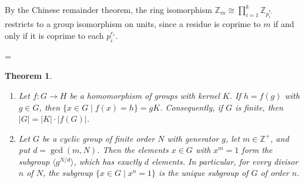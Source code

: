 \documentclass[11pt]{article}
\makeatletter
\theoremstyle{ntstyle}
\newtheorem{theorem}{Theorem}[subsection]
\newcommand{\statementitems}{\mbox{}}
\let\nt@closedisplay\]
\def\nt@guardedclose{\@ifnextchar\par{\nt@closeafterpar}{\@ifnextchar\end{\postdisplaypenalty\@M\nt@closedisplay}{\nt@closedisplay}}}
\def\nt@closeafterpar\par{\@ifnextchar\par{\nt@closeafterpar}{\@ifnextchar\end{\postdisplaypenalty\@M\nt@closedisplay\par}{\nt@closedisplay\par}}}
\renewenvironment{proof}[1][\proofname]{\par
  \pushQED{\qed}\normalfont\topsep\medskipamount\edef\nt@afterproof{\@endparpenalty=\the\@endparpenalty\relax}\@beginparpenalty\@M\@endparpenalty\@M\let\]\nt@guardedclose\trivlist\item[]\textit{#1\@addpunct{.}} \ignorespaces}{\ifvmode\addpenalty\@M\fi\popQED\nt@afterproof\endtrivlist\@endpefalse}
\makeatother
\begin{document}
\begin{proof} By the Chinese remainder theorem, the ring
	isomorphism $\mathbb{Z}_m \cong \prod_{i=1}^{k}\mathbb{Z}_{p_i^{e_i}}$
	restricts to a group isomorphism on units, since a residue is coprime
	to $m$ if and only if it is coprime to each $p_i^{e_i}$.

\end{proof}
\begin{theorem}\label{thm:6.6.5}\statementitems

	\begin{enumerate}[label={\alph*)}]
		\item Let $f:G\to H$ be a homomorphism of groups with kernel $K$. If
		      $h=f(g)$ with $g\in G$, then $\{x\in G\mid f(x)=h\}=gK$.
		      Consequently, if $G$ is finite, then $|G|=|K|\cdot|f(G)|$.
		\item Let $G$ be a cyclic group of finite order $N$ with generator $g$,
		      let $m\in\mathbb{Z}^+$, and put $d=\gcd(m,N)$. Then the elements
		      $x\in G$ with $x^m=1$ form the subgroup $\langle g^{N/d}\rangle$,
		      which has exactly $d$ elements. In particular, for every divisor $n$
		      of $N$, the subgroup $\{x\in G\mid x^n=1\}$ is the unique subgroup of
		      $G$ of order $n$.
	\end{enumerate}

\end{theorem}
\end{document}
